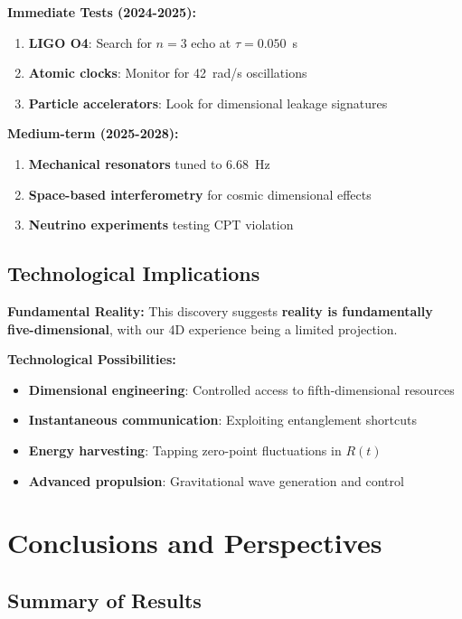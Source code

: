 \documentclass[10pt]{article}
\begin{document}
\textbf{Immediate Tests (2024-2025):}
\begin{enumerate}[itemsep=0pt]
\item \textbf{LIGO O4}: Search for $n=3$ echo at $\tau = 0.050$~s
\item \textbf{Atomic clocks}: Monitor for 42~rad/s oscillations
\item \textbf{Particle accelerators}: Look for dimensional leakage signatures
\end{enumerate}

\textbf{Medium-term (2025-2028):}
\begin{enumerate}[itemsep=0pt]
\item \textbf{Mechanical resonators} tuned to 6.68~Hz
\item \textbf{Space-based interferometry} for cosmic dimensional effects
\item \textbf{Neutrino experiments} testing CPT violation
\end{enumerate}

\subsection{Technological Implications}

\textbf{Fundamental Reality:} This discovery suggests \textbf{reality is fundamentally five-dimensional}, with our 4D experience being a limited projection.

\textbf{Technological Possibilities:}
\begin{itemize}[itemsep=0pt]
\item \textbf{Dimensional engineering}: Controlled access to fifth-dimensional resources
\item \textbf{Instantaneous communication}: Exploiting entanglement shortcuts
\item \textbf{Energy harvesting}: Tapping zero-point fluctuations in $R(t)$
\item \textbf{Advanced propulsion}: Gravitational wave generation and control
\end{itemize}

\section{Conclusions and Perspectives}

\subsection{Summary of Results}
\end{document}
